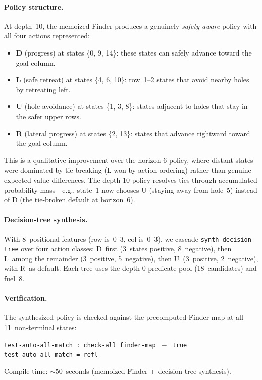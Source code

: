 \paragraph{Policy structure.}
At depth~10, the memoized Finder produces a genuinely \emph{safety-aware} policy with all four actions represented:
\begin{itemize}
  \item \textbf{D} (progress) at states \{0, 9, 14\}: these states can safely advance toward the goal column.
  \item \textbf{L} (safe retreat) at states \{4, 6, 10\}: row~1--2 states that avoid nearby holes by retreating left.
  \item \textbf{U} (hole avoidance) at states \{1, 3, 8\}: states adjacent to holes that stay in the safer upper rows.
  \item \textbf{R} (lateral progress) at states \{2, 13\}: states that advance rightward toward the goal column.
\end{itemize}
This is a qualitative improvement over the horizon-6 policy, where distant states were dominated by tie-breaking (L won by action ordering) rather than genuine expected-value differences.
The depth-10 policy resolves ties through accumulated probability mass---e.g., state~1 now chooses U (staying away from hole~5) instead of D (the tie-broken default at horizon~6).

\paragraph{Decision-tree synthesis.}
With 8~positional features (row-is~0--3, col-is~0--3), we cascade \texttt{synth-decision-tree} over four action classes: D~first (3~states positive, 8~negative), then L~among the remainder (3~positive, 5~negative), then U~(3~positive, 2~negative), with R~as default.
Each tree uses the depth-0 predicate pool (18~candidates) and fuel~8.

\paragraph{Verification.}
The synthesized policy is checked against the precomputed Finder map at all 11~non-terminal states:
\begin{center}
\texttt{test-auto-all-match : check-all finder-map $\equiv$ true}\\
\texttt{test-auto-all-match = refl}
\end{center}
Compile time: ${\sim}50$~seconds (memoized Finder + decision-tree synthesis).

